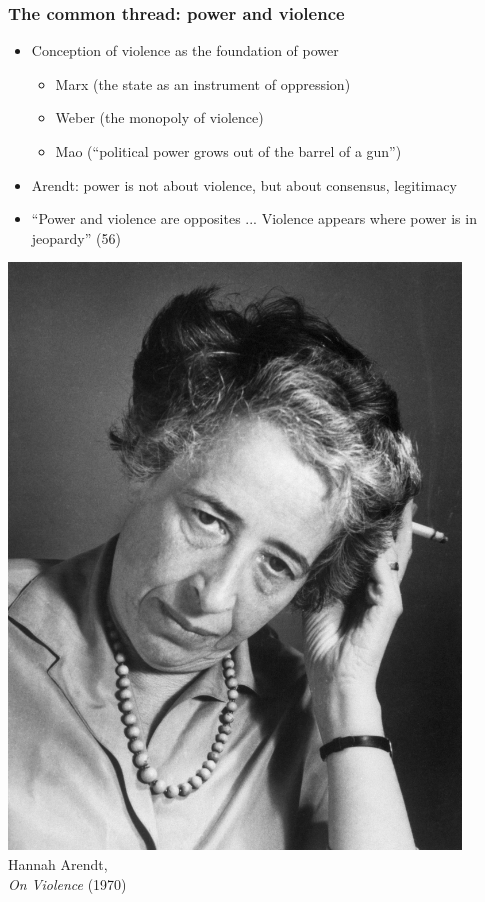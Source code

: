 \documentclass[aspectratio=43]{beamer}
\begin{document}
\begin{frame}
\frametitle{The common thread: power and violence}
\centering

\begin{minipage}{0.66\textwidth}\centering
\begin{itemize}
\item Conception of violence as the foundation of power
  \begin{itemize}
  \item {\small Marx (the state as an instrument of oppression)}
  \item {\small Weber (the monopoly of violence)}
  \item {\small Mao (``political power grows out of the barrel of a gun'')}
  \end{itemize}
\item Arendt: power is not about violence, but about consensus, legitimacy
\item ``Power and violence are opposites ... Violence appears where power is in jeopardy'' (56)
\end{itemize}
\end{minipage}\hfill
\begin{minipage}{0.33\textwidth}\centering
\includegraphics[width = 0.9\textwidth]{img/arendt}\\
Hannah Arendt,\\\textit{On Violence} (1970)
\end{minipage}

\end{frame}
\end{document}
